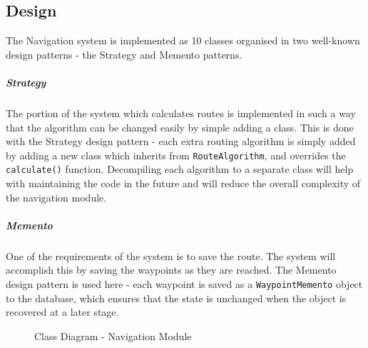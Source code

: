 \documentclass[english]{article}
\begin{document}
        \subsection{Design}
            The Navigation system is implemented as 10 classes organised in two well-known design patterns - the Strategy and Memento patterns.

            \subparagraph{Strategy}
            The portion of the system which calculates routes is implemented in such a way that the algorithm can be changed easily by simple adding a class. This is done with the Strategy design pattern - each extra routing algorithm is simply added by adding a new class which inherits from \texttt{RouteAlgorithm}, and overrides the \texttt{calculate()} function. Decompiling each algorithm to a separate class will help with maintaining the code in the future and will reduce the overall complexity of the navigation module.

            \subparagraph{Memento}
            One of the requirements of the system is to save the route. The system will accomplish this by saving the waypoints as they are reached. The Memento design pattern is used here - each waypoint is saved as a \texttt{WaypointMemento} object to the database, which ensures that the state is unchanged when the object is recovered at a later stage.

        \begin{figure}[H]
            \centering	            \centerline{}
            \caption{Class Diagram - Navigation Module}
        \end{figure}
\end{document}

